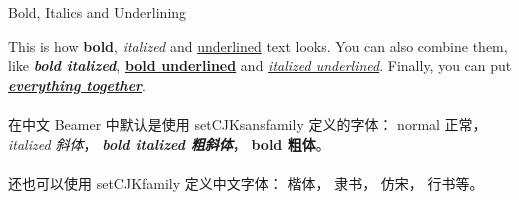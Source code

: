 \documentclass{ctexbeamer}
\begin{document}
\begin{frame}{Bold, Italics and Underlining}

This is how \textbf{bold}, \textit{italized} and
\underline{underlined} text looks.
You can also combine them, like \textbf{\textit{bold 
italized}}, \underline{\textbf{bold underlined}} and
\textit{\underline{italized underlined}}.
Finally, you can put
\textbf{\textit{\underline{everything together}}}.\\~\\

在中文 Beamer 中默认是使用 setCJKsansfamily 定义的字体：
normal 正常，\textit{italized 斜体}，
\textbf{\textit{bold italized 粗斜体}}，
\textbf{bold 粗体}。\\~\\

还也可以使用 setCJKfamily 定义中文字体：{ 楷体}，
{ 隶书}，{ 仿宋}，
{ 行书}等。

\end{frame}
\end{document}
